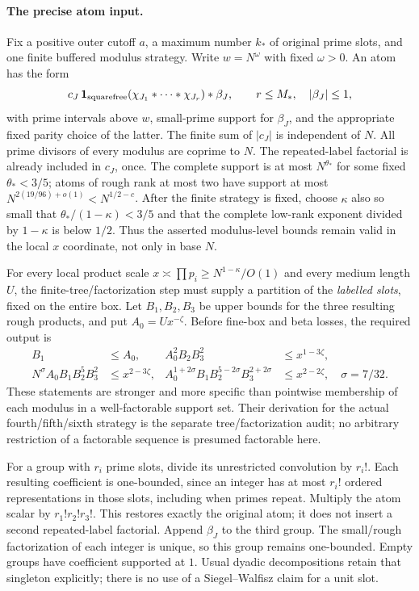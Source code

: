 \paragraph{The precise atom input.}
Fix a positive outer cutoff $a$, a maximum number $k_*$ of original
prime slots, and one finite buffered modulus strategy. Write $w=N^\omega$
with fixed $\omega>0$. An atom has the form
\begin{equation}\label{eq:actual-k-atom-input}
 c_J\,\mathbf1_{\rm squarefree}
       (\chi_{J_1}*\cdots*\chi_{J_r})*\beta_J,
 \qquad r\le M_*,\quad |\beta_J|\le1,
\end{equation}
with prime intervals above $w$, small-prime support for $\beta_J$, and
the appropriate fixed parity choice of the latter. The finite sum of
$|c_J|$ is independent of $N$. All prime divisors of every modulus
are coprime to $N$. The repeated-label factorial is already included
in $c_J$, once. The complete support is at most $N^{\theta_*}$ for
some fixed $\theta_*<3/5$; atoms of rough rank at most two have support
at most $N^{2(19/96)+o(1)}<N^{1/2-c}$.
After the finite strategy is fixed, choose $\kappa$ also so small that
$\theta_* /(1-\kappa)<3/5$ and that the complete low-rank exponent
divided by $1-\kappa$ is below $1/2$. Thus the asserted modulus-level
bounds remain valid in the local $x$ coordinate, not only in base $N$.

For every local product scale $x\asymp\prod p_i\ge N^{1-\kappa}/O(1)$
and every medium length $U$, the finite-tree/factorization step must
supply a partition of the \emph{labelled slots}, fixed on the entire
box. Let $B_1,B_2,B_3$ be upper bounds for the three resulting rough
products, and put $A_0=Ux^{-\zeta}$. Before fine-box and beta losses,
the required output is
\begin{align}\label{eq:actual-k-factorization-input}
 B_1&\le A_0,&
 A_0^2B_2B_3^2&\le x^{1-3\zeta},\nonumber\\
 N^\sigma A_0B_1B_2^5B_3^2&\le x^{2-3\zeta},&
 A_0^{1+2\sigma}B_1B_2^{5-2\sigma}B_3^{2+2\sigma}
 &\le x^{2-2\zeta},\quad \sigma=7/32.
\end{align}
These statements are stronger and more specific than pointwise
membership of each modulus in a well-factorable support set. Their
derivation for the actual fourth/fifth/sixth strategy is the separate
tree/factorization audit; no arbitrary restriction of a factorable
sequence is presumed factorable here.

For a group with $r_i$ prime slots, divide its unrestricted convolution
by $r_i!$. Each resulting coefficient is one-bounded, since an integer
has at most $r_i!$ ordered representations in those slots, including
when primes repeat. Multiply the atom scalar by $r_1!r_2!r_3!$.
This restores exactly the original atom; it does not insert a second
repeated-label factorial. Append $\beta_J$ to the third group. The
small/rough factorization of each integer is unique, so this group
remains one-bounded. Empty groups have coefficient supported at $1$.
Usual dyadic decompositions retain that singleton explicitly; there
is no use of a Siegel--Walfisz claim for a unit slot.

